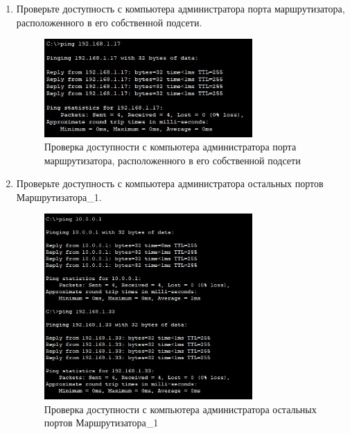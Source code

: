 \documentclass[bachelor, och, labwork]{shiza}
\begin{document}
\begin{enumerate}
    \item Проверьте доступность с компьютера администратора порта маршрутизатора, расположенного в его собственной подсети.
    
    \begin{figure}[H]
        \centering      %
        \includegraphics[width=0.75\textwidth]{5}
        \caption{Проверка доступности с компьютера администратора порта маршрутизатора, расположенного в его собственной подсети}
        \label{fig:image1}
    \end{figure}

    \item Проверьте доступность с компьютера администратора остальных портов Маршрутизатора_1.
    
    \begin{figure}[H]
        \centering      %
        \includegraphics[width=0.75\textwidth]{6}
        \caption{Проверка доступности с компьютера администратора остальных портов Маршрутизатора_1}
        \label{fig:image1}
    \end{figure}


\end{enumerate}
\end{document}
